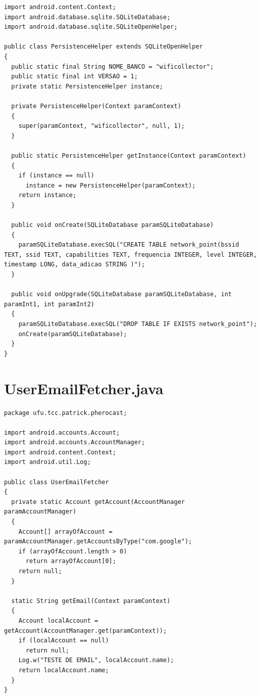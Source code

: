 \documentclass[12pt, %
openright, 
oneside, %
a4paper,    %
brazil]{facom-ufu-abntex2}
\begin{document}
\begin{anexosenv}
\begin{lstlisting}
import android.content.Context;
import android.database.sqlite.SQLiteDatabase;
import android.database.sqlite.SQLiteOpenHelper;

public class PersistenceHelper extends SQLiteOpenHelper
{
  public static final String NOME_BANCO = "wificollector";
  public static final int VERSAO = 1;
  private static PersistenceHelper instance;

  private PersistenceHelper(Context paramContext)
  {
    super(paramContext, "wificollector", null, 1);
  }

  public static PersistenceHelper getInstance(Context paramContext)
  {
    if (instance == null)
      instance = new PersistenceHelper(paramContext);
    return instance;
  }

  public void onCreate(SQLiteDatabase paramSQLiteDatabase)
  {
    paramSQLiteDatabase.execSQL("CREATE TABLE network_point(bssid TEXT, ssid TEXT, capabilities TEXT, frequencia INTEGER, level INTEGER, timestamp LONG, data_adicao STRING )");
  }

  public void onUpgrade(SQLiteDatabase paramSQLiteDatabase, int paramInt1, int paramInt2)
  {
    paramSQLiteDatabase.execSQL("DROP TABLE IF EXISTS network_point");
    onCreate(paramSQLiteDatabase);
  }
}

\end{lstlisting}
\section{UserEmailFetcher.java}
\begin{lstlisting}
package ufu.tcc.patrick.pherocast;

import android.accounts.Account;
import android.accounts.AccountManager;
import android.content.Context;
import android.util.Log;

public class UserEmailFetcher
{
  private static Account getAccount(AccountManager paramAccountManager)
  {
    Account[] arrayOfAccount = paramAccountManager.getAccountsByType("com.google");
    if (arrayOfAccount.length > 0)
      return arrayOfAccount[0];
    return null;
  }

  static String getEmail(Context paramContext)
  {
    Account localAccount = getAccount(AccountManager.get(paramContext));
    if (localAccount == null)
      return null;
    Log.w("TESTE DE EMAIL", localAccount.name);
    return localAccount.name;
  }
}

\end{lstlisting}

\end{anexosenv}


\printindex
\end{document}
